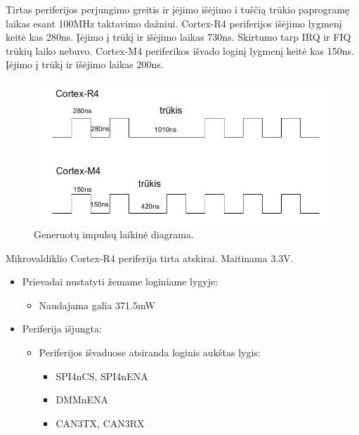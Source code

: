 \documentclass[a4paper, 12pt]{article} %
\begin{document}
\begin{onehalfspacing}
Tirtas periferijos perjungimo greitis ir \k{i}\.ejimo i\v{s}\.ejimo i tu\v{s}\v{c}i\k{a} tr\=ukio paprogram\k{e} laikas esant 100MHz taktavimo da\v{z}niui.  
Cortex-R4 periferijos i\v{s}\.ejimo lygmen\k{i} keit\.{e} kas 280ns. \k{I}\.ejimo \k{i} tr\=uk\k{i} ir i\v{s}\.ejimo laikas 730ns. Skirtumo tarp IRQ ir FIQ tr\=uki\k{u} laiko nebuvo. Cortex-M4 periferikos i\v{s}vado login\k{i} lygmen\k{i} keit\.e kas 150ns. \k{I}\.ejimo \k{i} tr\=uk\k{i} ir i\v{s}\.ejimo laikas 200ns.
\begin{figure}[H] %
\centering %
\includegraphics[scale=0.4]{pav/trukiai.jpg} %
\captionsetup{labelformat=numbfirst} %
\captionsetup{labelseparator=tarpas}
\caption{Generuot\k{u} impuls\k{u} laikin\.e diagrama.}
\label{vienas}
\end{figure}
Mikrovaldiklio Cortex-R4 periferija tirta atskirai. Maitinama 3.3V.
\begin{itemize}
\item Prievadai nustatyti \v{z}emame loginiame lygyje:
\begin{itemize}
\item Naudajama galia 371.5mW
\end{itemize}
\item Periferija i\v{s}jungta:
\begin{itemize}
\item Periferijos i\v{s}vaduose atsiranda loginis auk\v{s}tas lygis:
\begin{itemize}
\item SPI4nCS, SPI4nENA
\item DMMnENA
\item CAN3TX, CAN3RX
\end{itemize}

\end{itemize}
\end{itemize}
\end{onehalfspacing}
\end{document}

